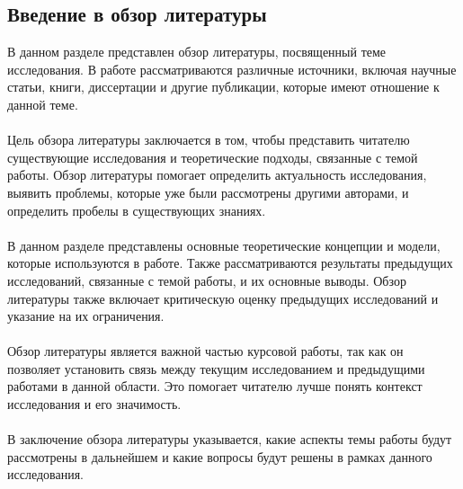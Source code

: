 \documentclass{article}
\begin{document}
\subsection{Введение в обзор литературы}
В данном разделе представлен обзор литературы, посвященный теме исследования. В работе рассматриваются различные источники, включая научные статьи, книги, диссертации и другие публикации, которые имеют отношение к данной теме.\\
~\\
Цель обзора литературы заключается в том, чтобы представить читателю существующие исследования и теоретические подходы, связанные с темой работы. Обзор литературы помогает определить актуальность исследования, выявить проблемы, которые уже были рассмотрены другими авторами, и определить пробелы в существующих знаниях.\\
~\\
В данном разделе представлены основные теоретические концепции и модели, которые используются в работе. Также рассматриваются результаты предыдущих исследований, связанные с темой работы, и их основные выводы. Обзор литературы также включает критическую оценку предыдущих исследований и указание на их ограничения.\\
~\\
Обзор литературы является важной частью курсовой работы, так как он позволяет установить связь между текущим исследованием и предыдущими работами в данной области. Это помогает читателю лучше понять контекст исследования и его значимость.\\
~\\
В заключение обзора литературы указывается, какие аспекты темы работы будут рассмотрены в дальнейшем и какие вопросы будут решены в рамках данного исследования.
\end{document}
